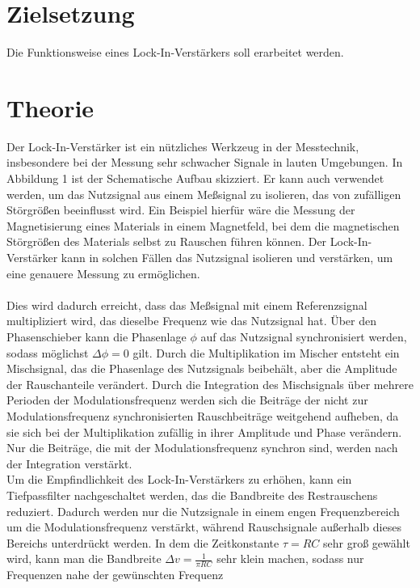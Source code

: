 \section{Zielsetzung}
\label{sec:Zielsetzung}
Die Funktionsweise eines Lock-In-Verstärkers soll erarbeitet werden.
\section{Theorie}
\label{sec:Theorie}

Der Lock-In-Verstärker ist ein nützliches Werkzeug in der Messtechnik, insbesondere bei der Messung sehr schwacher Signale in lauten Umgebungen. In Abbildung 1 ist der Schematische Aufbau skizziert. Er kann auch verwendet werden, um das Nutzsignal aus einem Meßsignal zu isolieren, das von zufälligen Störgrößen beeinflusst wird. Ein Beispiel hierfür wäre die Messung der Magnetisierung eines Materials in einem Magnetfeld, bei dem die magnetischen Störgrößen des Materials selbst zu Rauschen führen können. Der Lock-In-Verstärker kann in solchen Fällen das Nutzsignal isolieren und verstärken, um eine genauere Messung zu ermöglichen. \\
\\
Dies wird dadurch erreicht, dass das Meßsignal mit einem Referenzsignal multipliziert wird, das dieselbe Frequenz wie das Nutzsignal hat. Über den Phasenschieber kann die Phasenlage $\phi$ auf das Nutzsignal synchronisiert werden, sodass möglichst $\Delta \phi = 0$ gilt.
Durch die Multiplikation im Mischer entsteht ein Mischsignal, das die Phasenlage des Nutzsignals beibehält, aber die Amplitude der Rauschanteile verändert. Durch die Integration des Mischsignals über mehrere Perioden der Modulationsfrequenz werden sich die Beiträge der nicht zur Modulationsfrequenz synchronisierten Rauschbeiträge weitgehend aufheben, da sie sich bei der Multiplikation zufällig in ihrer Amplitude und Phase verändern. Nur die Beiträge, die mit der Modulationsfrequenz synchron sind, werden nach der Integration verstärkt. \\
Um die Empfindlichkeit des Lock-In-Verstärkers zu erhöhen, kann ein Tiefpassfilter nachgeschaltet werden, das die Bandbreite des Restrauschens reduziert. Dadurch werden nur die Nutzsignale in einem engen Frequenzbereich um die Modulationsfrequenz verstärkt, während Rauschsignale außerhalb dieses Bereichs unterdrückt werden.
In dem die Zeitkonstante $\tau = RC$ sehr groß gewählt wird, kann man die Bandbreite $\Delta v = \frac{1}{\pi RC}$ sehr klein machen, sodass nur Frequenzen nahe der gewünschten Frequenz

